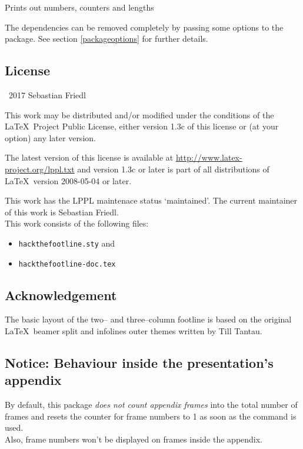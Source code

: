 \documentclass[11pt]{ltxdoc}
\newcommand{\ltxcmd}[1]{\texttt{#1}}
\begin{document}
	\medskip
	Prints out numbers, counters and lengths
	
	\bigskip
	The dependencies can be removed completely by passing some options to the package. See section \ref{packageoptions} for further details.
	
	
	\subsection*{License}
	\begin{small}
		\textcopyright\ 2017 Sebastian Friedl
		
		\smallskip
		This work may be distributed and/or modified under the conditions of the \LaTeX\ Project Public License, either version 1.3c of this license or (at your option) any later version.
		
		\smallskip
		The latest version of this license is available at \url{http://www.latex-project.org/lppl.txt} and version 1.3c or later is part of all distributions of \LaTeX\ version 2008-05-04 or later.
		
		\smallskip
		This work has the LPPL maintenace status \enquote*{maintained}. The current maintainer of this work is Sebastian Friedl. \\
		This work consists of the following files:
		\begin{itemize} \itemsep 0pt
			\item \texttt{hackthefootline.sty} and
			\item \texttt{hackthefootline-doc.tex}
		\end{itemize}
	\end{small}
	
	
	\subsection*{Acknowledgement}
	The basic layout of the two-- and three--column footline is based on the original \LaTeX\ beamer split and infolines outer themes written by Till Tantau.
	
	
	\subsection*{Notice: Behaviour inside the presentation's appendix}
	By default, this package \emph{does not count appendix frames} into the total number of frames and resets the counter for frame numbers to 1 as soon as the \ltxcmd{\appendix} command is used. \\
	Also, frame numbers won't be displayed on frames inside the appendix.
	
\end{document}
